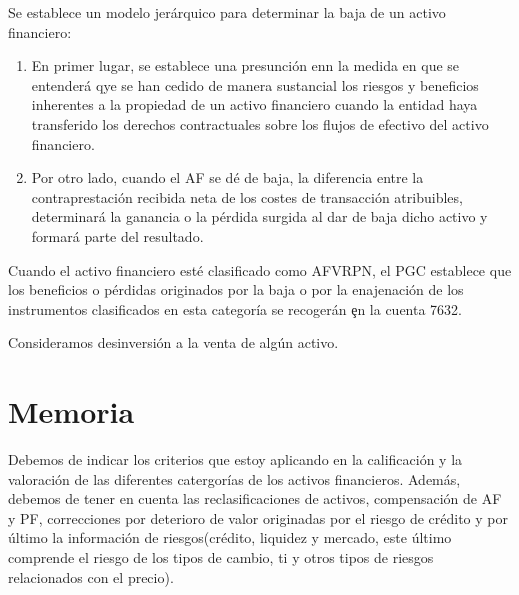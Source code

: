 Se establece un modelo jerárquico para determinar la baja de un activo financiero:
\begin{enumerate}
    \item En primer lugar, se establece una presunción enn la medida en que se entenderá qye se han cedido de manera sustancial los riesgos y beneficios inherentes a la propiedad de un activo financiero cuando la entidad haya transferido los derechos contractuales sobre los flujos de efectivo del activo financiero.
    \item Por otro lado, cuando el AF se dé de baja, la diferencia entre la contraprestación recibida neta de los costes de transacción atribuibles, determinará la ganancia o la pérdida surgida al dar de baja dicho activo y formará parte del resultado.
\end{enumerate}

Cuando el activo financiero esté clasificado como AFVRPN, el PGC establece que los beneficios o pérdidas originados por la baja o por la enajenación de los instrumentos clasificados en esta categoría se recogerán \c{en la cuenta 7632}.










Consideramos desinversión a la venta de algún activo. 
\newpage
\section{Memoria}

Debemos de indicar los criterios que estoy aplicando en la calificación y la valoración de las diferentes catergorías de los activos financieros. 
Además, debemos de tener en cuenta las reclasificaciones de activos, compensación de AF y PF, correcciones por deterioro de valor originadas por el riesgo de crédito y por último la información de riesgos(crédito, liquidez y mercado, este último comprende el riesgo de los tipos de cambio, ti y otros tipos de riesgos relacionados con el precio).


